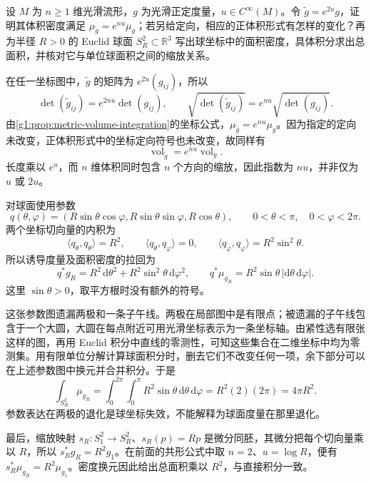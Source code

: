 \begin{exercise}\label{g1:ex:conformal-density-sphere-area}
	设 \(M\) 为 \(n\geq1\) 维光滑流形，\(g\) 为光滑正定度量，\(u\in C^\infty(M)\)。令 \(\widetilde g=e^{2u}g\)，证明其体积密度满足 \(\mu_{\widetilde g}=e^{nu}\mu_g\)；若另给定向，相应的正体积形式有怎样的变化？再为半径 \(R>0\) 的 Euclid 球面 \(S_R^2\subset\mathbb R^3\) 写出球坐标中的面积密度，具体积分求出总面积，并核对它与单位球面积之间的缩放关系。
\end{exercise}
\begin{solution}
	在任一坐标图中，\(\widetilde g\) 的矩阵为 \(e^{2u}(g_{ij})\)，所以
	\[
		\det(\widetilde g_{ij})=e^{2nu}\det(g_{ij}),\qquad
		\sqrt{\det(\widetilde g_{ij})}=e^{nu}\sqrt{\det(g_{ij})}.
	\]
	由\cref{g1:prop:metric-volume-integration}的坐标公式，\(\mu_{\widetilde g}=e^{nu}\mu_g\)。因为指定的定向未改变，正体积形式中的坐标定向符号也未改变，故同样有
	\[
		\operatorname{vol}_{\widetilde g}=e^{nu}\operatorname{vol}_g.
	\]
	长度乘以 \(e^u\)，而 \(n\) 维体积同时包含 \(n\) 个方向的缩放，因此指数为 \(nu\)，并非仅为 \(u\) 或 \(2u\)。

	对球面使用参数
	\[
		q(\theta,\varphi)
		=(R\sin\theta\cos\varphi,R\sin\theta\sin\varphi,R\cos\theta),
		\qquad 0<\theta<\pi,\quad 0<\varphi<2\pi.
	\]
	两个坐标切向量的内积为
	\[
		\langle q_\theta,q_\theta\rangle=R^2,\qquad
		\langle q_\theta,q_\varphi\rangle=0,\qquad
		\langle q_\varphi,q_\varphi\rangle=R^2\sin^2\theta.
	\]
	所以诱导度量及面积密度的拉回为
	\[
		q^*g_R=R^2\,\mathrm{d}\theta^2+R^2\sin^2\theta\,\mathrm{d}\varphi^2,
		\qquad q^*\mu_{g_R}=R^2\sin\theta\,|\mathrm{d}\theta\,\mathrm{d}\varphi|.
	\]
	这里 \(\sin\theta>0\)，取平方根时没有额外的符号。

	这张参数图遗漏两极和一条子午线。两极在局部图中是有限点；被遗漏的子午线包含于一个大圆，大圆在每点附近可用光滑坐标表示为一条坐标轴。由紧性选有限张这样的图，再用 Euclid 积分中直线的零测性，可知这些集合在二维坐标中均为零测集。用有限单位分解计算球面积分时，删去它们不改变任何一项，余下部分可以在上述参数图中换元并合并积分。于是
	\[
		\int_{S_R^2}\mu_{g_R}
		=\int_0^{2\pi}\int_0^\pi R^2\sin\theta\,\mathrm{d}\theta\,\mathrm{d}\varphi
		=R^2(2)(2\pi)=4\pi R^2.
	\]
	参数表达在两极的退化是球坐标失效，不能解释为球面度量在那里退化。

	最后，缩放映射 \(s_R:S_1^2\to S_R^2\)、\(s_R(p)=Rp\) 是微分同胚，其微分把每个切向量乘以 \(R\)，所以 \(s_R^*g_R=R^2g_1\)。在前面的共形公式中取 \(n=2\)、\(u=\log R\)，便有 \(s_R^*\mu_{g_R}=R^2\mu_{g_1}\)。密度换元因此给出总面积乘以 \(R^2\)，与直接积分一致。
\end{solution}

